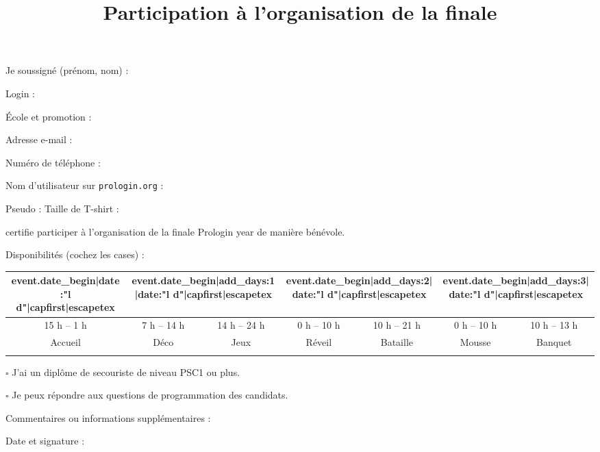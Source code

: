\documentclass[a4paper,11pt]{prologin}
\title{Participation à l'organisation de la finale}
\begin{document}
{
Je soussigné (prénom, nom) : \hrulefill

Login : \hrulefill

École et promotion : \hrulefill

Adresse e-mail : \hrulefill

Numéro de téléphone : \hrulefill

Nom d'utilisateur sur \texttt{prologin.org} : \hrulefill

Pseudo : \hrulefill \hspace{0.1cm}
Taille de T-shirt : \hrulefill

}

certifie participer à l'organisation de la finale Prologin {{ year }} de
manière bénévole.

Disponibilités (cochez les cases) :

\begin{center}
\begin{tabular}{|c|c|c|c|c|c|c|}

\hline
{{ event.date_begin|date:"l d"|capfirst|escapetex }} &
\multicolumn{2}{c|}{ {{ event.date_begin|add_days:1|date:"l d"|capfirst|escapetex }} } &
\multicolumn{2}{c|}{ {{ event.date_begin|add_days:2|date:"l d"|capfirst|escapetex }} } &
\multicolumn{2}{c|}{ {{ event.date_begin|add_days:3|date:"l d"|capfirst|escapetex }} }
\tabularnewline
\hline
15 h -- 1 h & 7 h -- 14 h & 14 h -- 24 h & 0 h -- 10 h & 10 h -- 21 h &
0 h -- 10 h & 10 h -- 13 h\tabularnewline
\hline
Accueil & Déco & Jeux & Réveil & Bataille & Mousse & Banquet\tabularnewline
\hline
&&&&&&\tabularnewline
\hline
\end{tabular}
\end{center}

{\Large$\square$} J'ai un diplôme de secouriste de niveau PSC1 ou plus.

{\Large$\square$} Je peux répondre aux questions de programmation des candidats.

\vspace{0.5cm}

Commentaires ou informations supplémentaires :

\vspace{3cm}

Date et signature :
\end{document}
